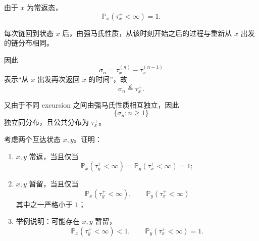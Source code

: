 \documentclass{ctexart}
\begin{document}
\begin{solution}
  由于 \(x\) 为常返态，
  \[
    \mathbb{P}_x(\tau_x^+<\infty)=1.
  \]

  每次链回到状态 \(x\) 后，由强马氏性质，从该时刻开始之后的过程与重新从 \(x\) 出发的链分布相同。

  因此
  \[
    \sigma_n=\tau_x^{(n)}-\tau_x^{(n-1)}
  \]
  表示“从 \(x\) 出发再次返回 \(x\) 的时间”，故
  \[
    \sigma_n\overset d=\tau_x^+.
  \]

  又由于不同 excursion 之间由强马氏性质相互独立，因此
  \[
    \{\sigma_n:n\ge1\}
  \]
  独立同分布，且公共分布为 \(\tau_x^+\)。
\end{solution}


\begin{problem}\label{pro:1.0.10}
  考虑两个互达状态 \(x,y\)。证明：

  \begin{enumerate}
    \item \(x,y\) 常返，当且仅当
      \[
        \mathbb{P}_x(\tau_y^+<\infty)=\mathbb{P}_y(\tau_x^+<\infty)=1;
      \]

    \item \(x,y\) 暂留，当且仅当
      \[
        \mathbb{P}_x(\tau_y^+<\infty),\qquad
        \mathbb{P}_y(\tau_x^+<\infty)
      \]
      其中之一严格小于 \(1\)；

    \item 举例说明：可能存在 \(x,y\) 暂留，
      \[
        \mathbb{P}_x(\tau_y^+<\infty)<1,
        \qquad
        \mathbb{P}_y(\tau_x^+<\infty)=1.
      \]
  \end{enumerate}
\end{problem}
\end{document}
